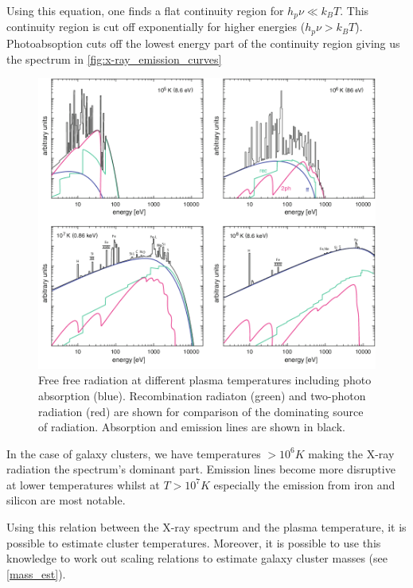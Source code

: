 Using this equation, one finds a flat continuity region for $h_p \nu \ll k_B T$. This continuity region is cut off exponentially for higher energies ($h_p \nu > k_B T$). Photoabsoption cuts off the lowest energy part of the continuity region giving us the spectrum in \autoref{fig:x-ray_emission_curves}

\begin{figure}[h]
 \centering
 \includegraphics[width=1\textwidth]{images/Chapter2/9-Figure6-1.png}
 \caption{Free free radiation at different plasma temperatures including photo absorption (blue). Recombination radiaton (green) and two-photon radiation (red) are shown for comparison of the dominating source of radiation. Absorption and emission lines are shown in black.  \citep{Boehringer2010}}
 \label{fig:x-ray_emission_curves}
\end{figure}

In the case of galaxy clusters, we have temperatures $> 10^6K$ making the X-ray radiation the spectrum's dominant part. Emission lines become more disruptive at lower temperatures whilst at $T > 10^7K$ especially the emission from iron and silicon are most notable.

Using this relation between the X-ray spectrum and the plasma temperature, it is possible to estimate cluster temperatures. Moreover, it is possible to use this knowledge to work out scaling relations to estimate galaxy cluster masses (see \cref{mass_est}).